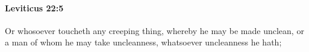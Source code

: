 
		\paragraph{Leviticus 22:5} %
			\label{LEVITICUS-22-5}

			Or whosoever toucheth any creeping thing, whereby he may be made unclean, or a man of whom he may take uncleanness, whatsoever uncleanness he hath;


